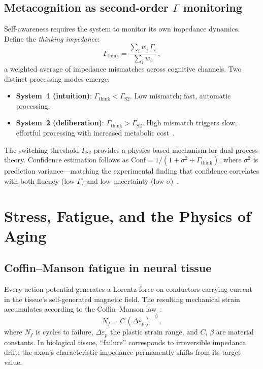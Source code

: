 ﻿\documentclass[aps,pre,twocolumn,superscriptaddress,floatfix]{revtex4-2}
\begin{document}
\subsection{Metacognition as second-order $\Gamma$ monitoring}
\label{sec:metacognition}

Self-awareness requires the system to monitor its own
impedance dynamics.
Define the \emph{thinking impedance}:
\begin{equation}
  \Gamma_{\mathrm{think}} =
    \frac{\sum_i w_i\,\Gamma_i}{\sum_i w_i}\,,
  \label{eq:gamma-think}
\end{equation}
a weighted average of impedance mismatches across
cognitive channels.
Two distinct processing modes emerge:
\begin{itemize}
  \item \textbf{System~1 (intuition)}:
    $\Gamma_{\mathrm{think}} < \Gamma_{\mathrm{S2}}$.
    Low mismatch; fast, automatic processing.
  \item \textbf{System~2 (deliberation)}:
    $\Gamma_{\mathrm{think}} > \Gamma_{\mathrm{S2}}$.
    High mismatch triggers slow, effortful processing
    with increased metabolic cost~\cite{Kahneman2011}.
\end{itemize}
The switching threshold $\Gamma_{\mathrm{S2}}$ provides
a physics-based mechanism for dual-process theory.
Confidence estimation follows as
$\mathrm{Conf} = 1/(1 + \sigma^2 + \Gamma_{\mathrm{think}})$,
where $\sigma^2$ is prediction variance---matching
the experimental finding that confidence correlates
with both fluency (low $\Gamma$) and low uncertainty
(low $\sigma$)~\cite{Alter2009}.


\section{Stress, Fatigue, and the Physics of Aging}
\label{sec:aging}

\subsection{Coffin--Manson fatigue in neural tissue}

Every action potential generates a Lorentz force
on conductors carrying current in the tissue's
self-generated magnetic field.
The resulting mechanical strain accumulates according
to the Coffin--Manson law~\cite{Coffin1954}:
\begin{equation}
  N_f = C\,(\Delta\varepsilon_p)^{-\beta}\,,
  \label{eq:coffin-manson}
\end{equation}
where $N_f$ is cycles to failure, $\Delta\varepsilon_p$
the plastic strain range, and $C$, $\beta$ are
material constants.
In biological tissue, ``failure'' corresponds to
irreversible impedance drift: the axon's characteristic
impedance permanently shifts from its target value.
\end{document}
